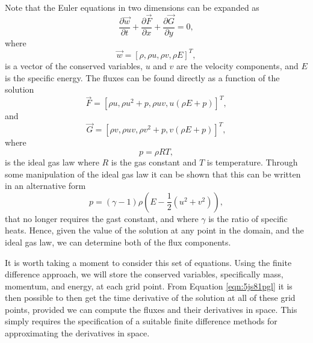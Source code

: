 Note that the Euler equations in two dimensions can be expanded as
\begin{equation}
	\label{eqn:5js81pgl}
	\frac{\partial \vec{w}}{\partial t} + \frac{\partial{\vec{F}}}{\partial x} + \frac{\partial{\vec{G}}}{\partial y} = 0,
\end{equation}
where
\begin{equation}
	\label{eqn:dh691kgu}
	\vec{w} = [\rho,\rho u, \rho v, \rho E]^T,
\end{equation}
is a vector of the conserved variables, $u$ and $v$ are the velocity components, and $E$ is the specific energy. The fluxes can be found directly as a function of the solution
\begin{equation}
	\label{eqn:sm5j29dj}
	\vec{F} = [\rho u,\rho u^2 + p, \rho uv, u(\rho E+p)]^T,
\end{equation}
and
\begin{equation}
	\label{eqn:029as5ns}
	\vec{G} = [\rho v,\rho u v, \rho v^2+p, v(\rho E+p)]^T,
\end{equation}
where
\begin{equation} 
	p = \rho R T,
\end{equation}
is the ideal gas law where $R$ is the gas constant and $T$ is temperature. Through some manipulation of the ideal gas law it can be shown that this can be written in an alternative form
\begin{equation} 
	p = (\gamma -1) \rho \left(E - \frac{1}{2}\left(u^2 + v^2 \right) \right),
\end{equation}
that no longer requires the gast constant, and where $\gamma$ is the ratio of specific heats. Hence, given the value of the solution at any point in the domain, and the ideal gas law, we can determine both of the flux components.

It is worth taking a moment to consider this set of equations. Using the finite difference approach, we will store the conserved variables, specifically mass, momentum, and energy, at each grid point. From Equation \ref{eqn:5js81pgl} it is then possible to then get the time derivative of the solution at all of these grid points, provided we can compute the fluxes and their derivatives in space. This simply requires the specification of a suitable finite difference methods for approximating the derivatives in space.

